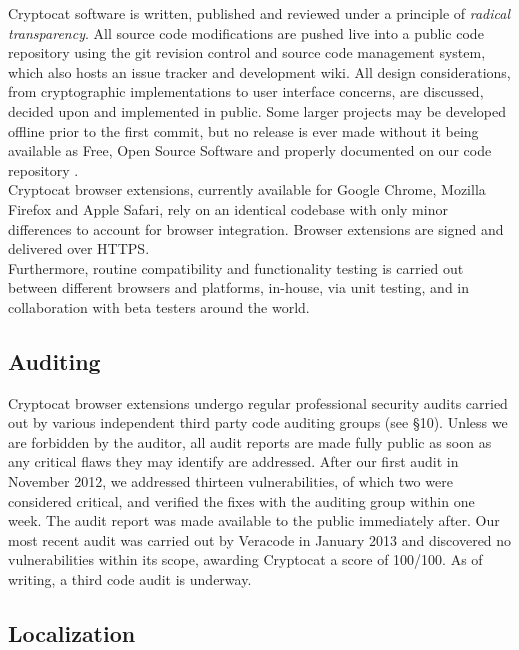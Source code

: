 \documentclass[letterpaper,twocolumn,10pt]{article}
\begin{document}
Cryptocat software is written, published and reviewed under a principle of \emph{radical transparency}. All source code modifications are pushed live into a public code repository using the git revision control and source code management system, which also hosts an issue tracker and development wiki. All design considerations, from cryptographic implementations to user interface concerns, are discussed, decided upon and implemented in public. Some larger projects may be developed offline prior to the first commit, but no release is ever made without it being available as Free, Open Source Software and properly documented on our code repository \cite{cryptocat-code}. \\
Cryptocat browser extensions, currently available for Google Chrome, Mozilla Firefox and Apple Safari, rely on an identical codebase with only minor differences to account for browser integration. Browser extensions are signed and delivered over HTTPS. \\
Furthermore, routine compatibility and functionality testing is carried out between different browsers and platforms, in-house, via unit testing, and in collaboration with beta testers around the world.

\subsection{Auditing}

Cryptocat browser extensions undergo regular professional security audits carried out by various independent third party code auditing groups (see \S10). Unless we are forbidden by the auditor, all audit reports are made fully public as soon as any critical flaws they may identify are addressed. After our first audit \cite{audit-cure53} in November 2012, we addressed thirteen vulnerabilities, of which two were considered critical, and verified the fixes with the auditing group within one week. The audit report was made available to the public immediately after. Our most recent audit \cite{audit-veracode} was carried out by Veracode in January 2013 and discovered no vulnerabilities within its scope, awarding Cryptocat a score of 100/100. As of writing, a third code audit is underway.

\subsection{Localization}
\end{document}
